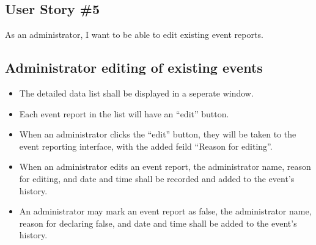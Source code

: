 \subsection{User Story \#5} 
As an administrator, I want to be able to edit existing event reports.

\subsection{Administrator editing of existing events}
\begin{itemize}
\item The detailed data list shall be displayed in a seperate window.
\item Each event report in the list will have an ``edit'' button.
\item When an administrator clicks the ``edit'' button, they will be taken to the event reporting interface, with the added feild ``Reason for editing''.
\item When an administrator edits an event report, the administrator name, reason for editing, and date and time shall be recorded and added to the event's history.
\item An administrator may mark an event report as false, the administrator name, reason for declaring false, and date and time shall be added to the event's history.
\end{itemize}

